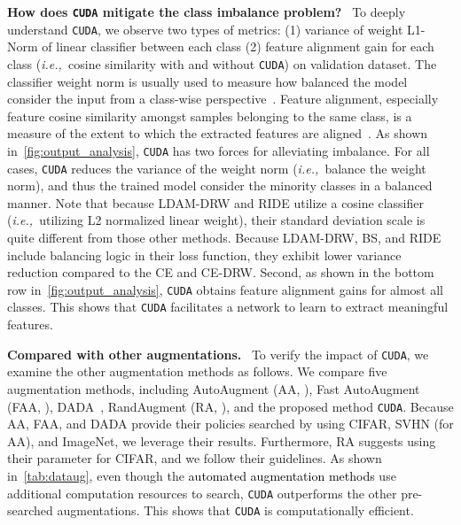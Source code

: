 \documentclass{article}
\newcommand{\ie}{\emph{i.e.,~}}
\newcommand{\myparagraph}[1]{\vspace{0.07cm}\noindent\textbf{#1}~}
\def\code#1{\texttt{#1}}
\newcommand{\alg}{\code{CUDA}\xspace}
\renewcommand*\cite[1]{\citep{#1}}
\newcommand{\rebut}[1]{\textcolor{black}{#1}}
\begin{document}
\myparagraph{How does \alg mitigate the class imbalance problem?}
To deeply understand \alg, we observe two types of metrics: 
(1) variance of weight L1-Norm of linear classifier between each class
(2) feature alignment gain for each class (\ie cosine similarity with and without \alg) on validation dataset.
The classifier weight norm is usually used to measure how balanced the model consider the input from a class-wise perspective~\cite{kang2019decoupling, alshammari2022long}. Feature alignment, especially feature cosine similarity amongst samples belonging to the same class, is a measure of the extent to which the extracted features are aligned~\cite{oh2021boil}. As shown in~\autoref{fig:output_analysis}, \alg has two forces for alleviating imbalance. For all cases, \alg reduces the variance of the weight norm (\ie balance the weight norm), and thus the trained model consider the minority classes in a balanced manner. Note that because LDAM-DRW and RIDE utilize a cosine classifier (\ie utilizing L2 normalized linear weight), their standard deviation scale is quite different from those other methods. Because LDAM-DRW, BS, and RIDE include balancing logic in their loss function, they exhibit lower variance reduction compared to the CE and CE-DRW. Second, as shown in the bottom row in~\autoref{fig:output_analysis}, \alg obtains feature alignment gains for almost all classes. This shows that \alg facilitates a network to learn to extract meaningful features.

\myparagraph{Compared with other augmentations.} To verify the impact of \alg, we examine the other augmentation methods as follows. We compare five augmentation methods, including AutoAugment (AA, \citealt{cubuk2019autoaugment}), Fast AutoAugment (FAA, \citealt{lim2019fast}), DADA~\cite{li2020dada}, RandAugment (RA, \citealt{cubuk2020randaugment}), and the proposed method \alg. Because AA, FAA, and DADA provide their policies searched by using CIFAR, SVHN (for AA), and ImageNet, we leverage their results. Furthermore, RA suggests using their parameter  for CIFAR, and we follow their guidelines. As shown in~\autoref{tab:dataug}, even though the \rebut{automated augmentation methods} use additional computation resources to search, \alg outperforms the other pre-searched augmentations. This shows that \alg is computationally efficient.
\end{document}
